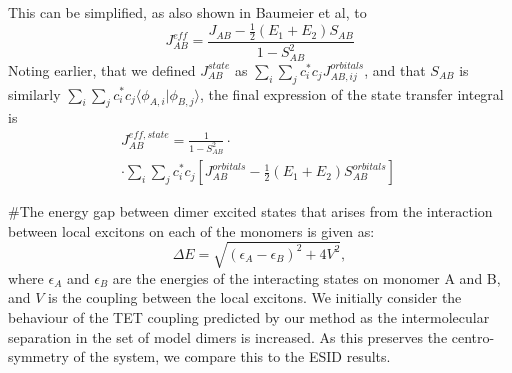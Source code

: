 \documentclass[aps,physrev,reprint,superscriptaddress,nofootinbib,amsmath,amssymb,a4paper]{revtex4-2}
\begin{document}
This can be simplified, as also shown in Baumeier et al, to 
\begin{equation}
    J_{AB}^{eff} = \frac{J_{AB}-\frac{1}{2}(E_1+E_2)S_{AB}}{1-S_{AB}^2}
\end{equation}
Noting earlier, that we defined $J_{AB}^{state}$ as $\sum_i\sum_jc_i^*c_jJ_{AB,ij}^{orbitals}$, and that $S_{AB}$ is similarly $\sum_i\sum_jc_i^*c_j\langle\phi_{A,i}|\phi_{B,j}\rangle$, the final expression of the state transfer integral is 
\begin{multline}
    J_{AB}^{eff,state} = \frac{1}{1-S_{AB}^2}\cdot\\\cdot\sum_i\sum_jc_i^*c_j\left[J_{AB}^{orbitals}-\frac{1}{2}(E_1+E_2)S_{AB}^{orbitals}\right]\
\end{multline}



#The energy gap between dimer excited states that arises from the interaction between local excitons on each of the monomers is given as:
\begin{equation}
    \Delta E = \sqrt{(\epsilon_A-\epsilon_B)^2+4V^2},
\end{equation}
where $\epsilon_A$ and $\epsilon_B$ are the energies of the interacting states on monomer A and B, and $V$ is the coupling between the local excitons.
We initially consider the behaviour of the TET coupling predicted by our method as the intermolecular separation in the set of model dimers is increased. As this preserves the centro-symmetry of the system, we compare this to the ESID results.
\end{document}
